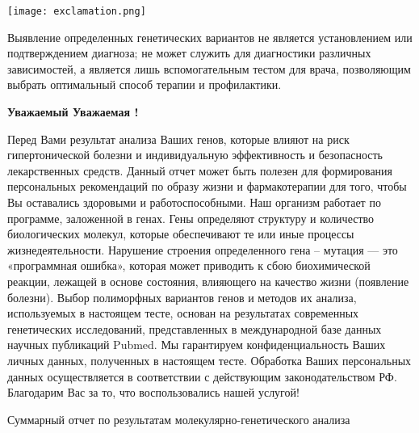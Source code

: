 \documentclass[russian,a4paper,12pt]{article}
\begin{document}
\vspace{-10mm}
\noindent
\parbox[b][3cm][t]{10mm}{
	\texttt{[image: exclamation.png]}}
\hfill
\parbox[b][3cm][t]{100mm}{
	Выявление определенных генетических вариантов не является установлением или подтверждением диагноза; не может служить для диагностики различных зависимостей, а является лишь вспомогательным тестом для врача, позволяющим выбрать оптимальный способ терапии и профилактики.}

\vspace{15mm}
\begin{center}
	\textbf{
		Уважаемый
		Уважаемая
		!}
\end{center}

Перед Вами результат анализа Ваших генов, которые влияют на риск гипертонической болезни и индивидуальную эффективность и безопасность лекарственных средств. Данный отчет может быть полезен для формирования персональных рекомендаций по образу жизни и фармакотерапии для того, чтобы Вы оставались здоровыми и работоспособными.
Наш организм работает по программе, заложенной в генах. Гены определяют структуру и количество биологических молекул, которые обеспечивают те или иные процессы жизнедеятельности. Нарушение строения определенного гена – мутация — это «программная ошибка», которая может приводить к сбою биохимической реакции, лежащей в основе состояния, влияющего на качество жизни (появление болезни).
Выбор полиморфных вариантов генов и методов их анализа, используемых в настоящем тесте, основан на результатах современных генетических исследований, представленных в международной базе данных научных публикаций Pubmed.
Мы гарантируем конфиденциальность Ваших личных данных, полученных в настоящем тесте. Обработка Ваших персональных данных осуществляется в соответствии с действующим законодательством РФ.
Благодарим Вас за то, что воспользовались нашей услугой!

\pagebreak
\begin{center}
	\large{Суммарный отчет по результатам молекулярно-генетического анализа}
\end{center}
\end{document}
